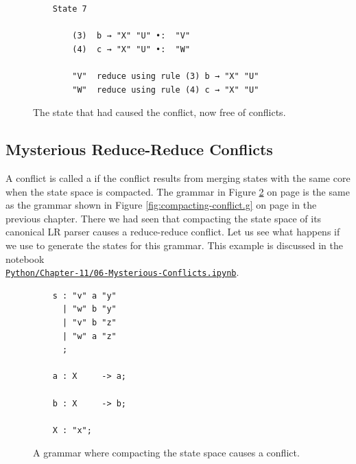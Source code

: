 \begin{figure}[!ht]
\centering
\begin{verbatim}
    State 7

        (3)  b → "X" "U" •:  "V"
        (4)  c → "X" "U" •:  "W"

        "V"  reduce using rule (3) b → "X" "U"
        "W"  reduce using rule (4) c → "X" "U"
\end{verbatim}
\vspace*{-0.3cm}
\caption{The state that had caused the conflict, now free of conflicts.}
\label{fig:Look-Ahead-Solved.state7}
\end{figure}
\FloatBarrier

\subsection{Mysterious Reduce-Reduce Conflicts}
A conflict is called a   if the conflict results from merging
states with the same core when the state space is compacted.  The grammar in Figure
\ref{fig:Mysterious-Conflicts.ipynb} on page \pageref{fig:Mysterious-Conflicts.ipynb} is the same as the
grammar shown in Figure \ref{fig:compacting-conflict.g} on page \pageref{fig:compacting-conflict.g} in the previous
chapter.  There we had seen that compacting the state space of its canonical LR parser causes a reduce-reduce
conflict.  Let us see what happens
if we use  to generate the states for this grammar.  This example is discussed in the notebook
\\[0.2cm]
\hspace*{1.3cm}
\href{https://github.com/karlstroetmann/Formal-Languages/blob/master/Python/Chapter-11/06-Mysterious-Conflicts.ipynb}{\texttt{Python/Chapter-11/06-Mysterious-Conflicts.ipynb}}.

\begin{figure}[!ht]
\centering
\begin{verbatim}
    s : "v" a "y"
      | "w" b "y"
      | "v" b "z"
      | "w" a "z"
      ;

    a : X     -> a;

    b : X     -> b;

    X : "x";
\end{verbatim}
\vspace*{-0.3cm}
\caption{A grammar where compacting the state space causes a conflict.}
\label{fig:Mysterious-Conflicts.ipynb}
\end{figure}
\vspace*{0.3cm}


